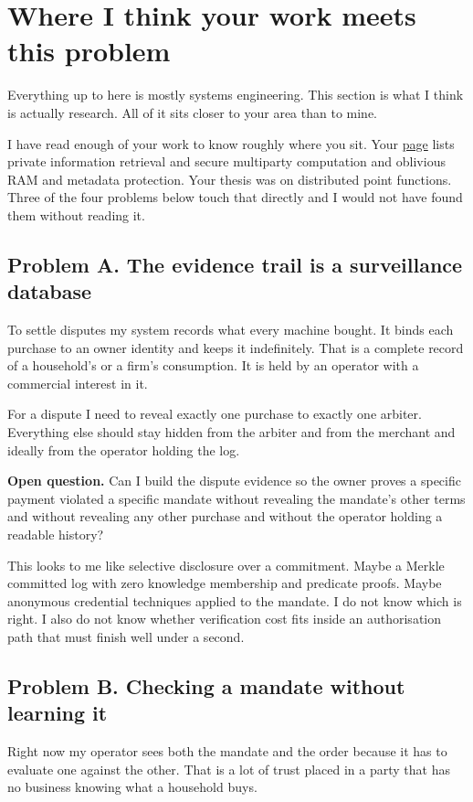 \documentclass[journal,onecolumn,11pt]{IEEEtran}
\newcommand{\q}[1]{\textcolor{warnc}{\textbf{Open question.}} #1}
\begin{document}
\section{Where I think your work meets this problem}\label{sec:crypto}

Everything up to here is mostly systems engineering. This section is what I think is
actually research. All of it sits closer to your area than to mine.

I have read enough of your work to know roughly where you sit. Your
\href{https://avadapal.github.io/}{page} lists private information retrieval and secure
multiparty computation and oblivious RAM and metadata protection. Your thesis was on
distributed point functions. Three of the four problems below touch that directly and I
would not have found them without reading it.

\subsection{Problem A. The evidence trail is a surveillance database}
To settle disputes my system records what every machine bought. It binds each purchase to
an owner identity and keeps it indefinitely. That is a complete record of a household's
or a firm's consumption. It is held by an operator with a commercial interest in it.

For a dispute I need to reveal exactly one purchase to exactly one arbiter. Everything
else should stay hidden from the arbiter and from the merchant and ideally from the
operator holding the log.

\q{Can I build the dispute evidence so the owner proves a specific payment violated a
specific mandate without revealing the mandate's other terms and without revealing any
other purchase and without the operator holding a readable history?}

This looks to me like selective disclosure over a commitment. Maybe a Merkle committed
log with zero knowledge membership and predicate proofs. Maybe anonymous credential
techniques applied to the mandate. I do not know which is right. I also do not know
whether verification cost fits inside an authorisation path that must finish well under a
second.

\subsection{Problem B. Checking a mandate without learning it}
Right now my operator sees both the mandate and the order because it has to evaluate one
against the other. That is a lot of trust placed in a party that has no business knowing
what a household buys.
\end{document}
